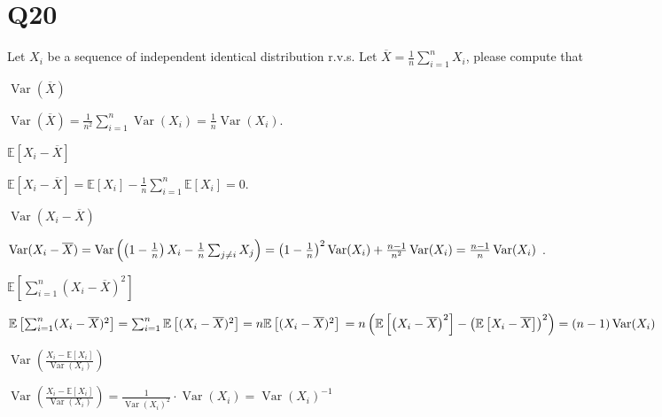 \documentclass[11pt]{article}
\begin{document}
\section*{Q20}
Let $X_{i}$ be a sequence of independent identical distribution r.v.s.
Let $\overline{X}=\frac{1}{n}\sum_{i=1}^{n }X_{i}$, please compute that
\begin{qparts}
    
    \item $\operatorname{Var}(\overline{X})$
    \begin{solution}
        $\operatorname{Var}(\overline{X})=\frac{1}{n^{2}}\sum_{i=1}^{n }\operatorname{Var}(X_{i})=\frac{1}{n}\operatorname{Var}(X_{i})$.
    \end{solution}

    \item $\mathbb{E}\left[ X_{i}-\overline{X} \right] $
    \begin{solution}
        $\mathbb{E}\left[ X_{i}-\overline{X} \right] =
        \mathbb{E}\left[ X_{i} \right]-\frac{1}{n}\sum_{i=1}^{n }\mathbb{E}\left[ X_{i} \right] =0 $.
    \end{solution}


    \item $\operatorname{Var}(X_{i}-\overline{X})$
    \begin{solution}
        $\operatorname{Var}(X_{i}-\overline{X})=
        \operatorname{Var}\left( \left( 1-\frac{1}{n} \right)X_{i}- \frac{1}{n}\sum_{j\neq i}X_{j} \right)
        =\left( 1-\frac{1}{n} \right)^{2}\operatorname{Var}(X_{i})+\frac{n-1}{n^{2}}\operatorname{Var}(X_{i})\\=\frac{n-1}{n }\operatorname{Var}(X_{i})
        $ .
    \end{solution}

    \item $\mathbb{E}\left[ \sum_{i=1}^{n }(X_{i}-\overline{X})^{2} \right] $
    \begin{solution}
        $\mathbb{E}\left[ \sum_{i=1}^{n }(X_{i}-\overline{X})^{2} \right] 
        =\sum_{i=1}^{n}\mathbb{E}\left[ (X_{i}-\overline{X})^{2} \right]
        =n\mathbb{E}\left[ (X_{i}-\overline{X})^{2} \right]
        \\=n\left( \mathbb{E}\left[ \left( X_{i}-\overline{X} \right)^{2} \right]
        -\left( \mathbb{E}\left[ X_{i}-\overline{X} \right]  \right)^{2} \right)
        =(n-1)\operatorname{Var}(X_{i})$
    \end{solution}
    \item $\operatorname{Var}\left( \frac{X_{i}-\mathbb{E}\left[ X_{i} \right] }{\operatorname{Var}(X_{i})} \right)$
    \begin{solution}
        $\operatorname{Var}\left( \frac{X_{i}-\mathbb{E}\left[ X_{i} \right] }{\operatorname{Var}(X_{i})} \right)
        =\frac{1}{\operatorname{Var}(X_{i})^{2}}\cdot \operatorname{Var}(X_{i})=\operatorname{Var}(X_{i})^{-1}$
    \end{solution}
\end{qparts}
\end{document}
